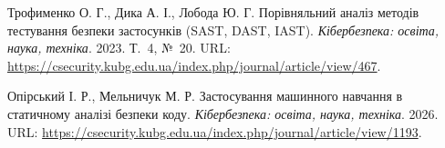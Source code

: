  Трофименко О. Г., Дика А. І., Лобода Ю. Г. Порівняльний аналіз методів тестування безпеки застосунків (SAST, DAST, IAST). \emph{Кібербезпека: освіта, наука, техніка}. 2023. Т.~4, №~20. URL: \url{https://csecurity.kubg.edu.ua/index.php/journal/article/view/467}.

 Опірський І. Р., Мельничук М. Р. Застосування машинного навчання в статичному аналізі безпеки коду. \emph{Кібербезпека: освіта, наука, техніка}. 2026. URL: \url{https://csecurity.kubg.edu.ua/index.php/journal/article/view/1193}.
